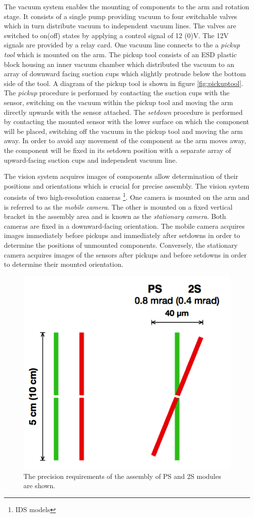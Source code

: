 \documentclass[fleqn,10pt]{SelfArx} %
\begin{document}
The vacuum system enables the mounting of components to the arm and rotation stage. It consists of a single pump providing vacuum to four switchable valves which in turn distribute vacuum to independent vacuum lines. The valves are switched to on(off) states by applying a control signal of 12 (0)V. The 12V signals are provided by a relay card. One vacuum line connects to the a \emph{pickup tool} which is mounted on the arm. The pickup tool consists of an ESD plastic block housing an inner vacuum chamber which distributed the vacuum to an array of downward facing suction cups which slightly protrude below the bottom side of the tool. A diagram of the pickup tool is shown in figure \ref{fig:pickuptool}. The \emph{pickup} procedure is performed by contacting the suction cups with the sensor, switching on the vacuum within the pickup tool and moving the arm directly upwards with the sensor attached. The \emph{setdown} procedure is performed by contacting the mounted sensor with the lower surface on which the component will be placed, switching off the vacuum in the pickup tool and moving the arm away. In order to avoid any movement of the component as the arm moves away, the component will be fixed in its setdown position with a separate array of upward-facing suction cups and independent vacuum line.

The vision system acquires images of components allow determination of their positions and orientations which is crucial for precise assembly. The vision system consists of two high-resolution cameras \footnote{IDS models}. One camera is mounted on the arm and is referred to as the \emph{mobile camera}. The other is mounted on a fixed vertical bracket in the assembly area and is known as the \emph{stationary camera}. Both cameras are fixed in a downward-facing orientation. The mobile camera acquires images immediately before pickups and immediately after setdowns in order to determine the positions of unmounted components. Conversely, the stationary camera acquires images of the sensors after pickups and before setdowns in order to determine their mounted orientation.


\begin{figure}[ht]\centering %
\includegraphics[width=0.5\linewidth]{Precision.png}
\caption{The precision requirements of the assembly of PS and 2S modules are shown.}
\label{fig:precision}
\end{figure}
\end{document}
